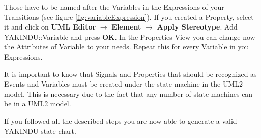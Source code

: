 Those have to be named after the Variables in the Expressions of your Transitions
(see figure \ref{fig:variableExpression}). If you created a Property, select it and click
on \textbf{UML Editor} $\rightarrow$ \textbf{Element} $\rightarrow$
\textbf{Apply Stereotype}. Add YAKINDU::Variable and press \textbf{OK}. In the
Properties View you can change now the Attributes of Variable to your needs.
Repeat this for every Variable in you Expressions.

It is important to know that Signals and Properties that should be recognized as Events
and Variables must be created under the state machine in the UML2 model. This is
necessary due to the fact that any number of state machines can be in a UML2 model.

If you followed all the described steps you are now able to generate a valid
YAKINDU state chart.




\clearpage